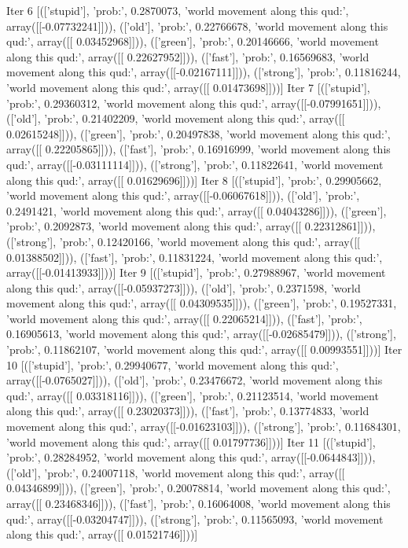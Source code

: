 Iter 6 [(['stupid'], 'prob:', 0.2870073, 'world movement along this qud:', array([[-0.07732241]])), (['old'], 'prob:', 0.22766678, 'world movement along this qud:', array([[ 0.03452968]])), (['green'], 'prob:', 0.20146666, 'world movement along this qud:', array([[ 0.22627952]])), (['fast'], 'prob:', 0.16569683, 'world movement along this qud:', array([[-0.02167111]])), (['strong'], 'prob:', 0.11816244, 'world movement along this qud:', array([[ 0.01473698]]))]
Iter 7 [(['stupid'], 'prob:', 0.29360312, 'world movement along this qud:', array([[-0.07991651]])), (['old'], 'prob:', 0.21402209, 'world movement along this qud:', array([[ 0.02615248]])), (['green'], 'prob:', 0.20497838, 'world movement along this qud:', array([[ 0.22205865]])), (['fast'], 'prob:', 0.16916999, 'world movement along this qud:', array([[-0.03111114]])), (['strong'], 'prob:', 0.11822641, 'world movement along this qud:', array([[ 0.01629696]]))]
Iter 8 [(['stupid'], 'prob:', 0.29905662, 'world movement along this qud:', array([[-0.06067618]])), (['old'], 'prob:', 0.2491421, 'world movement along this qud:', array([[ 0.04043286]])), (['green'], 'prob:', 0.2092873, 'world movement along this qud:', array([[ 0.22312861]])), (['strong'], 'prob:', 0.12420166, 'world movement along this qud:', array([[ 0.01388502]])), (['fast'], 'prob:', 0.11831224, 'world movement along this qud:', array([[-0.01413933]]))]
Iter 9 [(['stupid'], 'prob:', 0.27988967, 'world movement along this qud:', array([[-0.05937273]])), (['old'], 'prob:', 0.2371598, 'world movement along this qud:', array([[ 0.04309535]])), (['green'], 'prob:', 0.19527331, 'world movement along this qud:', array([[ 0.22065214]])), (['fast'], 'prob:', 0.16905613, 'world movement along this qud:', array([[-0.02685479]])), (['strong'], 'prob:', 0.11862107, 'world movement along this qud:', array([[ 0.00993551]]))]
Iter 10 [(['stupid'], 'prob:', 0.29940677, 'world movement along this qud:', array([[-0.0765027]])), (['old'], 'prob:', 0.23476672, 'world movement along this qud:', array([[ 0.03318116]])), (['green'], 'prob:', 0.21123514, 'world movement along this qud:', array([[ 0.23020373]])), (['fast'], 'prob:', 0.13774833, 'world movement along this qud:', array([[-0.01623103]])), (['strong'], 'prob:', 0.11684301, 'world movement along this qud:', array([[ 0.01797736]]))]
Iter 11 [(['stupid'], 'prob:', 0.28284952, 'world movement along this qud:', array([[-0.0644843]])), (['old'], 'prob:', 0.24007118, 'world movement along this qud:', array([[ 0.04346899]])), (['green'], 'prob:', 0.20078814, 'world movement along this qud:', array([[ 0.23468346]])), (['fast'], 'prob:', 0.16064008, 'world movement along this qud:', array([[-0.03204747]])), (['strong'], 'prob:', 0.11565093, 'world movement along this qud:', array([[ 0.01521746]]))]
